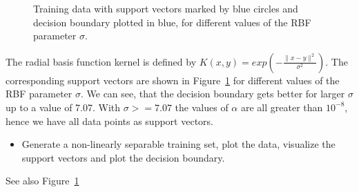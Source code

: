 \documentclass[a4]{article}
\begin{document}
\begin{figure}[h!]
\caption{Training data with support vectors marked by blue circles and decision boundary plotted in blue, for different values of the RBF parameter $\sigma$.}
\label{fig:sv_kernel}
\end{figure}
The radial basis function kernel is defined by $K(x,y) = exp(-\frac{\|x-y\|^2}{\sigma^2})$.
The corresponding support vectors are shown in Figure~\ref{fig:sv_kernel} for different values of the RBF parameter $\sigma$. We can see, that the decision boundary gets better for larger $\sigma$ up to a value of 7.07. With $\sigma>=7.07$ the values of $\alpha$ are all greater than $10^{-8}$, hence we have all data points as support vectors.

\begin{itemize}
\item Generate a non-linearly separable training set, plot the data, visualize the support vectors and plot the decision boundary.
\end{itemize}
See also Figure~\ref{fig:sv_kernel}




% 
% 
\end{document}
